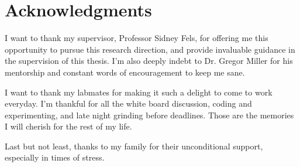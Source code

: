 
\chapter{Acknowledgments}

I want to thank my supervisor, Professor Sidney Fels, for offering me this opportunity to pursue this research direction, and provide invaluable guidance in the supervision of this thesis. I'm also deeply indebt to Dr. Gregor Miller for his mentorship and constant words of encouragement to keep me sane.

I want to thank my labmates for making it such a delight to come to work everyday. I'm thankful for all the white board discussion, coding and experimenting, and late night grinding before deadlines. Those are the memories I will cherish for the rest of my life.

Last but not least, thanks to my family for their unconditional support, especially in times of stress.